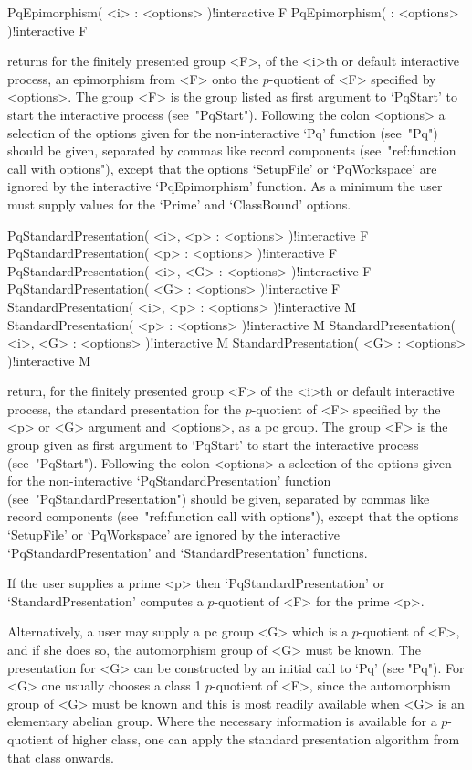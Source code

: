 \>PqEpimorphism( <i> : <options> )!{interactive} F
\>PqEpimorphism( : <options> )!{interactive} F

returns for the finitely presented group <F>, of  the  <i>th  or  default
interactive  {\ANUPQ}  process,  an  epimorphism  from   <F>   onto   the
$p$-quotient of <F> specified by <options>. The group <F>  is  the  group
listed as first argument to `PqStart' to start the  interactive  {\ANUPQ}
process (see~"PqStart"). Following the colon <options> a selection of the
options given for the non-interactive `Pq' function (see~"Pq") should  be
given, separated by commas like record components (see~"ref:function call
with options"), except that the options `SetupFile' or `PqWorkspace'  are
ignored by the interactive `PqEpimorphism' function.  As  a  minimum  the
user must supply values for the `Prime' and `ClassBound' options.

\>PqStandardPresentation( <i>, <p> : <options> )!{interactive} F
\>PqStandardPresentation( <p> : <options> )!{interactive} F
\>PqStandardPresentation( <i>, <G> : <options> )!{interactive} F
\>PqStandardPresentation( <G> : <options> )!{interactive} F
\>StandardPresentation( <i>, <p> : <options> )!{interactive} M
\>StandardPresentation( <p> : <options> )!{interactive} M
\>StandardPresentation( <i>, <G> : <options> )!{interactive} M
\>StandardPresentation( <G> : <options> )!{interactive} M

return, for the finitely presented group <F>  of  the  <i>th  or  default
interactive  {\ANUPQ}  process,  the  standard   presentation   for   the
$p$-quotient of <F> specified by the <p> or <G> argument  and  <options>,
as a pc group. The group <F> is the group  given  as  first  argument  to
`PqStart' to start  the  interactive  {\ANUPQ}  process  (see~"PqStart").
Following the colon <options> a selection of the options  given  for  the
non-interactive             `PqStandardPresentation'             function
(see~"PqStandardPresentation") should be given, separated by commas  like
record components (see~"ref:function call with options"), except that the
options `SetupFile' or  `PqWorkspace'  are  ignored  by  the  interactive
`PqStandardPresentation' and `StandardPresentation' functions.

If the  user  supplies  a  prime  <p>  then  `PqStandardPresentation'  or
`StandardPresentation' computes a $p$-quotient of <F> for the prime <p>.

Alternatively, a user may supply a pc group <G> which is  a  $p$-quotient
of <F>, and if she does so, the automorphism group of <G> must be  known.
The presentation for <G> can be constructed by an initial  call  to  `Pq'
(see "Pq"). For <G> one usually chooses a class 1  $p$-quotient  of  <F>,
since the automorphism group of <G>  must  be  known  and  this  is  most
readily available when <G> is an  elementary  abelian  group.  Where  the
necessary information is available for a $p$-quotient  of  higher  class,
one can  apply  the  standard  presentation  algorithm  from  that  class
onwards.

